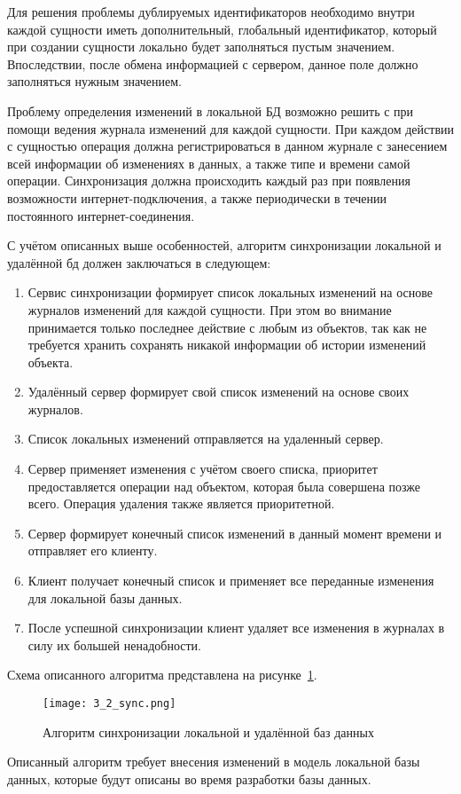 Для решения проблемы дублируемых идентификаторов необходимо внутри каждой сущности иметь дополнительный, глобальный идентификатор, который при создании сущности локально будет заполняться пустым значением.
Впоследствии, после обмена информацией с сервером, данное поле должно заполняться нужным значением.

Проблему определения изменений в локальной БД возможно решить с при помощи ведения журнала изменений для каждой сущности.
При каждом действии с сущностью операция должна регистрироваться в данном журнале с занесением всей информации об изменениях в данных, а также типе и времени самой операции.
Синхронизация должна происходить каждый раз при появления возможности интернет-подключения, а также периодически в течении постоянного интернет-соединения.

С учётом описанных выше особенностей, алгоритм синхронизации локальной и удалённой бд должен заключаться в следующем:
\begin{enumerate}
    \item Сервис синхронизации формирует список локальных изменений на основе журналов изменений для каждой сущности.
    При этом во внимание принимается только последнее действие с любым из объектов, так как не требуется хранить сохранять никакой информации об истории изменений объекта.
    \item Удалённый сервер формирует свой список изменений на основе своих журналов.
    \item Список локальных изменений отправляется на удаленный сервер.
    \item Сервер применяет изменения с учётом своего списка, приоритет предоставляется операции над объектом, которая была совершена позже всего.
    Операция удаления также является приоритетной.
    \item Сервер формирует конечный список изменений в данный момент времени и отправляет его клиенту.
    \item Клиент получает конечный список и применяет все переданные изменения для локальной базы данных.
    \item После успешной синхронизации клиент удаляет все изменения в журналах в силу их большей ненадобности.
\end{enumerate}

Схема описанного алгоритма представлена на рисунке~\ref{fig:design:sync:diagram}.

\begin{figure}[p]
    \centering
    \texttt{[image: 3\_2\_sync.png]}
    \caption{Алгоритм синхронизации локальной и удалённой баз данных}
    \label{fig:design:sync:diagram}
\end{figure}

Описанный алгоритм требует внесения изменений в модель локальной базы данных, которые будут описаны во время разработки базы данных.